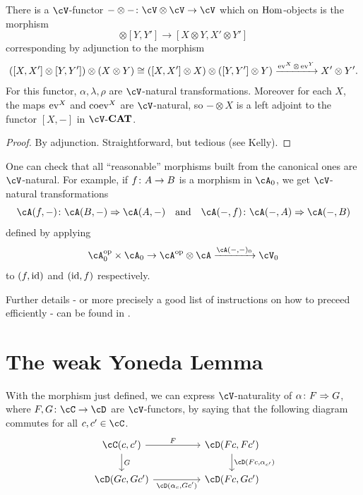 \documentclass[a4paper,11pt,oneside,openany]{scrbook}
\begin{document}
\begin{prop}
	There is a $ \cV $-functor $ -\otimes -\from \cV \otimes \cV \to \cV $ which
    on $ \operatorname{\text{Hom}} $-objects is the morphism
	\begin{displaymath}
		[X,X']\otimes [Y,Y'] \to [X\otimes Y , X'\otimes Y']
	\end{displaymath}
	corresponding by adjunction to the morphism
	\begin{displaymath}
		([X,X']\otimes[Y,Y']) \otimes (X\otimes Y)\cong ([X,X']\otimes X)\otimes ([Y,Y']\otimes Y) \xrightarrow{\operatorname{ev}^X \otimes \operatorname{ev}^Y} X'\otimes Y'.
	\end{displaymath}
	For this functor, $ \alpha,\lambda,\rho $ are $ \cV $-natural
    transformations. Moreover for each $ X $, the maps $ \operatorname{ev}^X $ and $ \operatorname{coev}^X $
    are $ \cV $-natural, so $ -\otimes X $ is a left adjoint to the functor $
    [X,-] $ in $ \cV $-${\normalfont\textbf{CAT}}$.
\end{prop}
\begin{proof}
	By adjunction. Straightforward, but tedious (see Kelly).
\end{proof}
\begin{rmk}
	One can check that all ``reasonable'' morphisms built from the canonical ones are $ \cV $-natural.
	For example, if $ f \colon A \to B $ is a morphism in $ \cA_0 $, we get $ \cV $-natural transformations
	\begin{displaymath}
		\cA(f,-) \from \cA(B,-)\Rightarrow \cA(A,-) \quad \text{and} \quad  \cA(-,f) \from \cA(-,A) \Rightarrow \cA(-,B)
	\end{displaymath}defined by applying
	\begin{displaymath}
		\cA_0^{\op}\times \cA_0 \to \cA^{\op} \otimes \cA \xrightarrow{\cA(-,-)_0} \cV_0
	\end{displaymath}
	to $ (f,\operatorname{id}) $ and $ (\operatorname{id},f) $ respectively.

	Further details - or more precisely a good list of instructions on how to
    preceed efficiently - can be found in \cite[\S 1.7 and 1.8]{Kelly}.
\end{rmk}


\section{The weak Yoneda Lemma}

\begin{rmk}
	With the morphism just defined, we can express $ \cV $-naturality of $
    \alpha \colon F \Rightarrow G $, where $ F,G\from \cC \to \cD $ are
    $\cV$-functors, by saying that the following diagram commutes for all $ c,c'
    \in \cC $.
	\begin{displaymath}
		\begin{tikzcd}[column sep = huge]
			\cC(c,c') \arrow[r, "F"]\arrow[d, "G"]& \cD(Fc, Fc')\arrow[d, "{\cD(Fc,\alpha_{c'})}"] \\
			\cD(Gc,Gc') \arrow[r, "{\cD(\alpha_c, Gc')}"' ]& \cD(Fc,Gc')
		\end{tikzcd}
	\end{displaymath}
\end{rmk}
\end{document}
